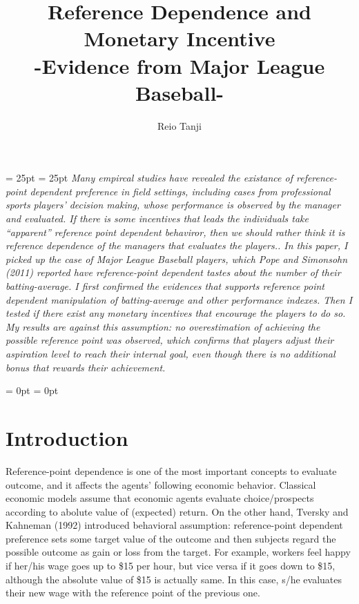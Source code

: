 \documentclass[dvipdfmx, 12pt]{article}
\begin{document}
\title{Reference Dependence and Monetary Incentive \\
-Evidence from Major League Baseball-}
\author{Reio Tanji}
\date{}
\maketitle

\leftskip = 25pt
\rightskip = 25pt
  \small
  \textit{
  Many empircal studies have revealed the existance of reference-point dependent preference in field settings, including cases from professional sports players' decision making, whose performance is observed by the manager and evaluated. If there is some incentives that leads the individuals take ``apparent'' reference point dependent behaviror, then we should rather think it is reference dependence of the managers that evaluates the players.. In this paper, I picked up the case of Major League Baseball players, which Pope and Simonsohn (2011) reported have reference-point dependent tastes about the number of their batting-average. I first confirmed the evidences that supports reference point dependent manipulation of batting-average and other performance indexes. Then I tested if there exist any monetary incentives that encourage the players to do so. My results are against this assumption: no overestimation of achieving the possible reference point was observed, which confirms that players adjust their aspiration level to reach their internal goal, even though there is no additional bonus that rewards their achievement.
  }



\leftskip = 0pt
\rightskip = 0pt
\normalsize


\section{Introduction}

Reference-point dependence is one of the most important concepts to evaluate outcome, and it affects the agents' following economic behavior. Classical economic models assume that economic agents evaluate choice/prospects according to abolute value of (expected) return. On the other hand, Tversky and Kahneman (1992) introduced behavioral assumption: reference-point dependent preference sets some target value of the outcome and then subjects regard the possible outcome as gain or loss from the target. For example, workers feel happy if her/his wage goes up to \$15 per hour, but vice versa if it goes down to \$15, although the absolute value of \$15 is actually same. In this case, s/he evaluates their new wage with the reference point of the previous one.
\end{document}
